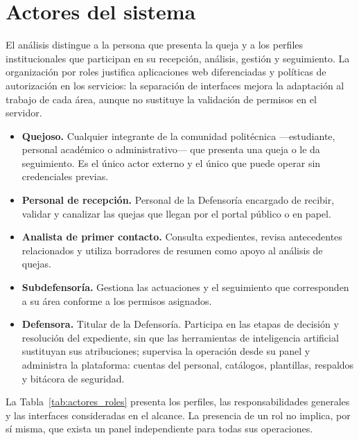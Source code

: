 	\section{Actores del sistema}
	\label{sec:actores}
	El análisis distingue a la persona que presenta la queja y a los perfiles institucionales
	que participan en su recepción, análisis, gestión y seguimiento. La organización por roles
	justifica aplicaciones web diferenciadas y políticas de autorización en los servicios: la
	separación de interfaces mejora la adaptación al trabajo de cada área, aunque no sustituye
	la validación de permisos en el servidor.
	
	\begin{itemize}
		\item \textbf{Quejoso.} Cualquier integrante de la comunidad politécnica ---estudiante,
		personal académico o administrativo--- que presenta una queja o le da seguimiento. Es el
		único actor externo y el único que puede operar sin credenciales previas.
	
		\item \textbf{Personal de recepción.} Personal de la Defensoría encargado de recibir,
		validar y canalizar las quejas que llegan por el portal público o en papel.
	
		\item \textbf{Analista de primer contacto.} Consulta expedientes, revisa antecedentes
		relacionados y utiliza borradores de resumen como apoyo al análisis de quejas.
		\item \textbf{Subdefensoría.} Gestiona las actuaciones y el seguimiento que corresponden
		a su área conforme a los permisos asignados.
		\item \textbf{Defensora.} Titular de la Defensoría. Participa en las etapas de decisión y
		resolución del expediente, sin que las herramientas de inteligencia artificial sustituyan sus
		atribuciones; supervisa la operación desde su panel y administra la plataforma: cuentas del
		personal, catálogos, plantillas, respaldos y bitácora de seguridad.
	\end{itemize}
	
	La Tabla~\ref{tab:actores_roles} presenta los perfiles, las responsabilidades generales
	y las interfaces consideradas en el alcance. La presencia de un rol no implica, por sí misma,
	que exista un panel independiente para todas sus operaciones.
	
	
	\small
	\renewcommand{\arraystretch}{1.25}
	\setlength{\tabcolsep}{4pt}
	
